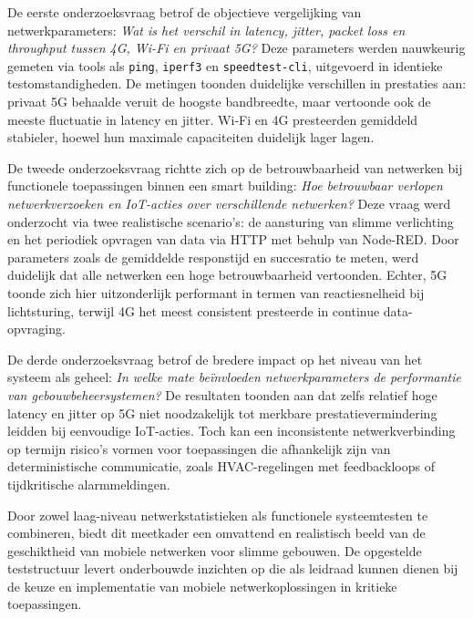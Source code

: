De eerste onderzoeksvraag betrof de objectieve vergelijking van netwerkparameters: \textit{Wat is het verschil in latency, jitter, packet loss en throughput tussen 4G, Wi-Fi en privaat 5G?} Deze parameters werden nauwkeurig gemeten via tools als \texttt{ping}, \texttt{iperf3} en \texttt{speedtest-cli}, uitgevoerd in identieke testomstandigheden. De metingen toonden duidelijke verschillen in prestaties aan: privaat 5G behaalde veruit de hoogste bandbreedte, maar vertoonde ook de meeste fluctuatie in latency en jitter. Wi-Fi en 4G presteerden gemiddeld stabieler, hoewel hun maximale capaciteiten duidelijk lager lagen.

De tweede onderzoeksvraag richtte zich op de betrouwbaarheid van netwerken bij functionele toepassingen binnen een smart building: \textit{Hoe betrouwbaar verlopen netwerkverzoeken en IoT-acties over verschillende netwerken?} Deze vraag werd onderzocht via twee realistische scenario’s: de aansturing van slimme verlichting en het periodiek opvragen van data via HTTP met behulp van Node-RED. Door parameters zoals de gemiddelde responstijd en succesratio te meten, werd duidelijk dat alle netwerken een hoge betrouwbaarheid vertoonden. Echter, 5G toonde zich hier uitzonderlijk performant in termen van reactiesnelheid bij lichtsturing, terwijl 4G het meest consistent presteerde in continue data-opvraging.

De derde onderzoeksvraag betrof de bredere impact op het niveau van het systeem als geheel: \textit{In welke mate beïnvloeden netwerkparameters de performantie van gebouwbeheersystemen?} De resultaten toonden aan dat zelfs relatief hoge latency en jitter op 5G niet noodzakelijk tot merkbare prestatievermindering leidden bij eenvoudige IoT-acties. Toch kan een inconsistente netwerkverbinding op termijn risico’s vormen voor toepassingen die afhankelijk zijn van deterministische communicatie, zoals HVAC-regelingen met feedbackloops of tijdkritische alarmmeldingen.

Door zowel laag-niveau netwerkstatistieken als functionele systeemtesten te combineren, biedt dit meetkader een omvattend en realistisch beeld van de geschiktheid van mobiele netwerken voor slimme gebouwen. De opgestelde teststructuur levert onderbouwde inzichten op die als leidraad kunnen dienen bij de keuze en implementatie van mobiele netwerkoplossingen in kritieke toepassingen.

